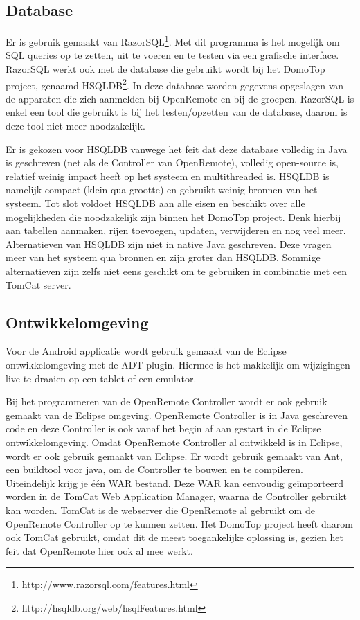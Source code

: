 \documentclass[]{article}
\begin{document}
\subsection{Database}
Er is gebruik gemaakt van
RazorSQL\footnote{http://www.razorsql.com/features.html}. Met dit programma is het mogelijk om
SQL queries op te zetten, uit te voeren en te testen via een grafische
interface. RazorSQL werkt ook met de database die gebruikt wordt bij het DomoTop project,
genaamd HSQLDB\footnote{http://hsqldb.org/web/hsqlFeatures.html}. In deze database worden gegevens opgeslagen van de
apparaten die zich aanmelden bij OpenRemote en bij de groepen.
RazorSQL is enkel een tool die gebruikt is bij het
testen/opzetten van de database, daarom is deze tool niet meer
noodzakelijk.

Er is gekozen voor HSQLDB vanwege het feit dat deze database volledig in Java
is geschreven (net als de Controller van OpenRemote), volledig open-source is,
relatief weinig impact heeft op het systeem en multithreaded is.
HSQLDB is namelijk compact (klein qua grootte) en gebruikt weinig bronnen van het systeem. 
Tot slot voldoet HSQLDB aan alle eisen en beschikt over alle mogelijkheden die noodzakelijk
zijn binnen het DomoTop project. Denk hierbij aan tabellen aanmaken, rijen
toevoegen, updaten, verwijderen en nog veel meer. Alternatieven van HSQLDB zijn
niet in native Java geschreven. Deze vragen meer van het systeem qua
bronnen en zijn groter dan HSQLDB. Sommige alternatieven zijn zelfs niet
eens geschikt om te gebruiken in combinatie met een TomCat server.

\subsection{Ontwikkelomgeving}
Voor de Android applicatie wordt gebruik gemaakt van de Eclipse
ontwikkelomgeving met de ADT plugin. Hiermee is het makkelijk om wijzigingen
live te draaien op een tablet of een emulator.

Bij het programmeren van de OpenRemote Controller wordt er ook gebruik gemaakt
van de Eclipse omgeving. OpenRemote Controller is in Java geschreven code
en deze Controller is ook vanaf het begin af aan gestart in de Eclipse
ontwikkelomgeving. Omdat OpenRemote Controller al ontwikkeld is in
Eclipse, wordt er ook gebruik gemaakt van Eclipse. Er wordt gebruik gemaakt van
Ant, een buildtool voor java, 
om de Controller te bouwen en te compileren. Uiteindelijk krijg
je \'e\'en WAR bestand. Deze WAR kan eenvoudig ge\"importeerd worden in de TomCat
Web Application Manager, waarna de Controller gebruikt kan worden. TomCat is
de webserver die OpenRemote al gebruikt om de OpenRemote Controller op te
kunnen zetten. Het DomoTop project heeft daarom ook TomCat gebruikt, omdat
dit de meest toegankelijke oplossing is, gezien het feit dat OpenRemote hier
ook al mee werkt.
\end{document}
